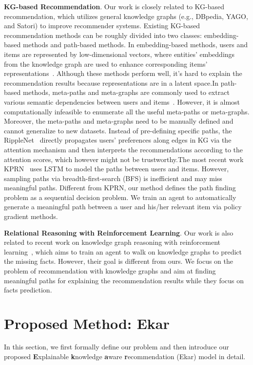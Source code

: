 \documentclass{article}
\newcommand{\name}{Ekar}
\newcommand{\xhdr}[1]{{\noindent\bfseries #1}.}
\begin{document}
\xhdr{KG-based Recommendation} Our work is closely related to KG-based recommendation, which utilizes general knowledge graphs (e.g., DBpedia, YAGO, and Satori) to improve recommender systems. Existing KG-based recommendation methods can be roughly divided into two classes: embedding-based methods and path-based methods. In embedding-based methods, users and items are represented by low-dimensional vectors, where entities' embeddings from the knowledge graph are used to enhance corresponding items' representations~\cite{Cao_2019,wang2018dkn,Wang_2019,zhang2016collaborative}. Although these methods perform well, it's hard to explain the recommendation results because representations are in a latent space.In path-based methods, meta-paths and meta-graphs are commonly used to extract various semantic dependencies between users and items~\cite{yu2014personalized,zhao2017meta}. However, it is almost
computationally infeasible to enumerate all the useful meta-paths or meta-graphs. Moreover, the meta-paths and meta-graphs need to be manually defined and cannot generalize to new datasets. Instead of pre-defining specific paths, the RippleNet~\cite{wang2018ripplenet} directly propagates users' preferences along edges in KG via the attention mechanism and then interprets the recommendations according to the attention scores, which however might not be trustworthy.The most recent work KPRN~\cite{Wang2018ExplainableRO} uses LSTM to model the paths between users and items. However, sampling paths via breadth-first-search (BFS) is inefficient and may miss meaningful paths.
Different from KPRN, our method defines the path finding problem as a sequential decision problem. We train an agent to automatically generate a meaningful path between a user and his/her relevant item via policy gradient methods.


\xhdr{Relational Reasoning with Reinforcement Learning} Our work is also related to recent work on knowledge graph reasoning with reinforcement learning~\cite{das2017go,lin2018multi,xiong2017deeppath}, which aims to train an agent to walk on knowledge graphs to predict the missing facts. However,
their goal is different from ours. We focus on the problem of recommendation with knowledge graphs and aim at finding meaningful paths for explaining the recommendation results while they focus on facts prediction.


%
 \section{Proposed Method: \name }
In this section, we first formally define our problem and then introduce our proposed \textbf{E}xplainable \textbf{k}nowledge \textbf{a}ware \textbf{r}ecommendation (\name) model in detail.
\end{document}
